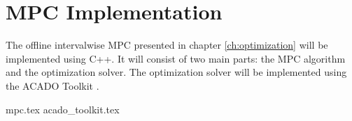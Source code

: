 \chapter{MPC Implementation}

The offline intervalwise MPC presented in chapter \ref{ch:optimization} will be implemented using C++. It will consist of two main parts: the MPC algorithm and the optimization solver. The optimization solver will be implemented using the ACADO Toolkit \cite{acadoHOUSKA}.


{mpc.tex}
{acado_toolkit.tex}